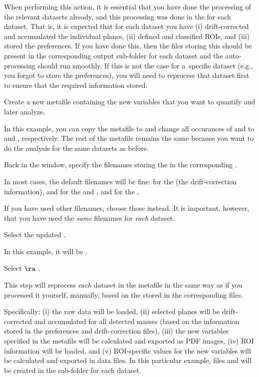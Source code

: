 When performing this action, it is essential that you have done the  processing of the relevant datasets already, and this processing was done in the  for each dataset. That is, it is expected that for each dataset you have (i) drift-corrected and accumulated the individual planes, (ii) defined and classified ROIs, and (iii) stored the preferences. If you have done this, then the files storing this  should be present in the corresponding output sub-folder for each dataset and the auto-processing should run smoothly. If this is not the case for a~specific dataset (e.g., you forgot to store the preferences), you will need to reprocess that dataset first to ensure that the required information  stored.

\s Create a new metafile containing the new variables that you want to quantify and later analyze. 

\bul In this example, you can copy the metafile  to  and change all occurances of  and  to 	and , respectively. The rest of the metafile remains the same because you want to do the analysis for the same datasets as before.

\s Back in the  window, specify the filenames storing the  in the corresponding .

\bul In most cases, the default filenames will be fine:  for the  (the drift-correction information),  and  for the  and , and  for the . 

\bul If you have used other filenames, choose those instead. It is important, however, that you have used the \emph{same} filenames for \emph{each} dataset.

\s Select the updated .

\bul In this example, it will be .

\s Select  $\ra$ .

\bul This step will reprocess \emph{each} dataset in the metafile in the same way as if you processed it yourself, manually, based on the  stored in the corresponding files. 

\bul Specifically: (i) the raw data will be loaded, (ii) selected planes will be drift-corrected and accumulated for all detected masses (based on the information stored in the preferences and drift-correction files), (iii) the new variables specified in the metafile will be calculated and exported as PDF images, (iv) ROI information will be loaded, and (v) ROI-specific values for the new variables will be calculated and exported in data files. In this particular example, files  and  will be created in the  sub-folder for each dataset.

